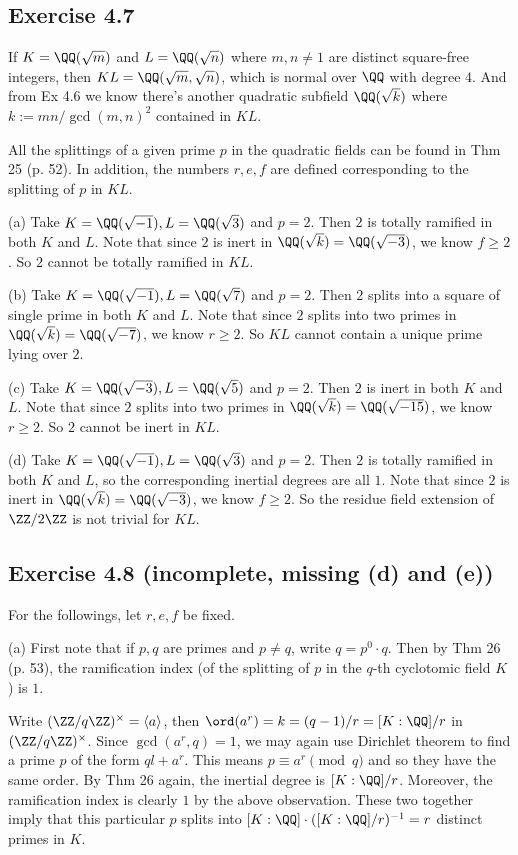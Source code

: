 \documentclass[../Chapter.tex]{subfiles}
\begin{document}
\subsection*{Exercise 4.7}

If $K=\QQ(\sqrt{m})$ and $L=\QQ(\sqrt{n})$ where $m,n\neq 1$ are distinct square-free integers, then $KL=\QQ(\sqrt{m},\sqrt{n})$, which is normal over $\QQ$ with degree $4$. And from Ex 4.6 we know there's another quadratic subfield $\QQ(\sqrt{k})$ where $k:=mn/\gcd(m,n)^2$ contained in $KL$.

All the splittings of a given prime $p$ in the quadratic fields can be found in Thm 25 (p. 52). In addition, the numbers $r,e,f$ are defined corresponding to the splitting of $p$ in $KL$.

(a) Take $K=\QQ(\sqrt{-1}),L=\QQ(\sqrt{3})$ and $p=2$. Then $2$ is totally ramified in both $K$ and $L$. Note that since $2$ is inert in $\QQ(\sqrt{k})=\QQ(\sqrt{-3})$, we know $f\geq 2$. So $2$ cannot be totally ramified in $KL$.

(b) Take $K=\QQ(\sqrt{-1}),L=\QQ(\sqrt{7})$ and $p=2$. Then $2$ splits into a square of single prime in both $K$ and $L$. Note that since $2$ splits into two primes in $\QQ(\sqrt{k})=\QQ(\sqrt{-7})$, we know $r\geq 2$. So $KL$ cannot contain a unique prime lying over $2$.

(c) Take $K=\QQ(\sqrt{-3}),L=\QQ(\sqrt{5})$ and $p=2$. Then $2$ is inert in both $K$ and $L$. Note that since $2$ splits into two primes in $\QQ(\sqrt{k})=\QQ(\sqrt{-15})$, we know $r\geq 2$. So $2$ cannot be inert in $KL$.

(d) Take $K=\QQ(\sqrt{-1}),L=\QQ(\sqrt{3})$ and $p=2$. Then $2$ is totally ramified in both $K$ and $L$, so the corresponding inertial degrees are all $1$. Note that since $2$ is inert in $\QQ(\sqrt{k})=\QQ(\sqrt{-3})$, we know $f\geq 2$. So the residue field extension of $\ZZ/2\ZZ$ is not trivial for $KL$.

\subsection*{Exercise 4.8 \color{red}(incomplete, missing (d) and (e))}

For the followings, let $r,e,f$ be fixed.

(a) First note that if $p,q$ are primes and $p\neq q$, write $q=p^0\cdot q$. Then by Thm 26 (p. 53), the ramification index (of the splitting of $p$ in the $q$-th cyclotomic field $K$) is $1$.

Write $(\ZZ/q\ZZ)^\times=\langle a\rangle$, then $\ord(a^r)=k=(q-1)/r=[K:\QQ]/r$ in $(\ZZ/q\ZZ)^\times$. Since $\gcd(a^r,q)=1$, we may again use Dirichlet theorem to find a prime $p$ of the form $ql+a^r$. This means $p\equiv a^r \pmod{q}$ and so they have the same order. By Thm 26 again, the inertial degree is $[K:\QQ]/r$. Moreover, the ramification index is clearly $1$ by the above observation. These two together imply that this particular $p$ splits into $[K:\QQ]\cdot([K:\QQ]/r)^{-1}=r$ distinct primes in $K$.
\end{document}
